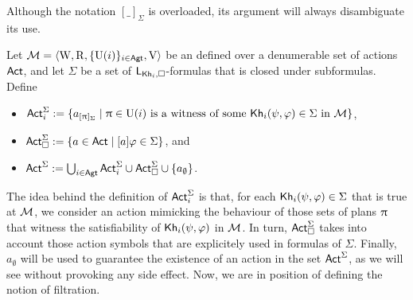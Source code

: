 \medskip

Although the notation $[\_]_\Sigma$ is overloaded, its argument will always disambiguate its use.

\medskip

\begin{definition}\label{def:filtration-actions}
Let $\mathcal{M} = \langle \operatorname{W},\operatorname{R}, \{ \operatorname{U}(i) \}_{i\in {\rm \sf Agt}}, \operatorname{V} \rangle$ be an \ults defined over a denumerable set of actions ${\rm \sf Act}$, and let $\Sigma$ be a set of $\mathsf{L}_{{\sf Kh}_i,\square}$-formulas that is closed under subformulas.
Define
\begin{itemize}
\item ${\rm \sf Act}^{\Sigma}_i := \{ a_{[\uppi]_\Sigma} \mid \uppi \in \operatorname{U}(i) \text{ is a witness of some } {\sf Kh}_i(\psi,\varphi) \in \Sigma \text{ in } \mathcal{M} \}$,
\item ${\rm \sf Act}^\Sigma_{\square} := \{ a \in {\rm \sf Act} \mid [a]\varphi \in \Sigma \}$, and
\item ${\rm \sf Act}^\Sigma := \bigcup_{i \in {\rm \sf Agt}} {\rm \sf Act}^\Sigma_i \cup {\rm \sf Act}^\Sigma_{\square}\cup \{ a_\emptyset \}$.
\end{itemize} 
\end{definition}

\medskip

The idea behind the definition of ${\rm \sf Act}^{\Sigma}_i$ is that, for each ${\sf Kh}_i(\psi,\varphi) \in \Sigma$ that is true at $\mathcal{M}$, we consider an action mimicking the behaviour of those sets of plans $\uppi$ that witness the satisfiability of ${\sf Kh}_i(\psi,\varphi)$ in $\mathcal{M}$. In turn, ${\rm \sf Act}^\Sigma_{\square}$ takes into account those action symbols that are explicitely used in formulas of $\Sigma$. Finally, $a_\emptyset$ will be used to guarantee the existence of an action in the set ${\rm \sf Act}^\Sigma$, as we will see without provoking any side effect. 
Now, we are in position of defining the notion of filtration. 

\medskip

